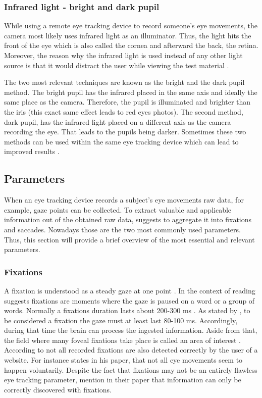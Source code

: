 \subsubsection{Infrared light - bright and dark pupil}
While using a remote eye tracking device to record someone's eye movements, the camera most likely uses infrared light as an illuminator. Thus, the light hits the front of the eye which is also called the cornea and afterward the back, the retina. 
Moreover, the reason why the infrared light is used instead of any other light source is that it would distract the user while viewing the test material \autocite[]{poole2006eye, biedert2010eyebook}.

The two most relevant techniques are known as the bright and the dark pupil method. The bright pupil has the infrared placed in the same axis and ideally the same place as the camera. Therefore, the pupil is illuminated and brighter than the iris (this exact same effect leads to red eyes photos). The second method, dark pupil, has the infrared light placed on a different axis as the camera recording the eye. That leads to the pupils being darker. 
Sometimes these two methods can be used within the same eye tracking device which can lead to improved results \autocite[]{tobii2018dark, goldberg2002eye}.

\subsection{Parameters}
\label{subsection:Parameters}
When an eye tracking device records a subject's eye movements raw data, for example, gaze points can be collected. To extract valuable and applicable information out of the obtained raw data, \textcite[]{blascheck2014state}  suggests to aggregate it into fixations and saccades. 
Nowadays those are the two most commonly used parameters.
Thus, this section will provide a brief overview of the most essential and relevant parameters.

\subsubsection{Fixations}
A fixation is understood as a steady gaze at one point \autocite[]{buscher2009you}.  In the context of reading \textcite[]{beymer2007eye} suggests fixations are moments where the gaze is paused on a word or a group of words. 
Normally a fixations duration lasts about 200-300 ms \autocite[]{kasneci2015online}. As stated by \textcite[]{buscher2009you}, to be considered a fixation the gaze must at least last 80-100 ms. Accordingly, during that time the brain can process the ingested information. Aside from that, the field where many foveal fixations take place is called an area of interest \autocite[]{djamasbi2014eye}.\\
According to \textcite[]{grzyb2016eye} not all recorded fixations are also detected correctly by the user of a website. For instance \textcite[]{bruneau2002eyes} states in his paper, that not all eye movements seem to happen voluntarily. 
Despite the fact that fixations may not be an entirely flawless eye tracking parameter, \textcite[]{biedert2010eyebook} mention in their paper that information can only be correctly discovered with fixations.

